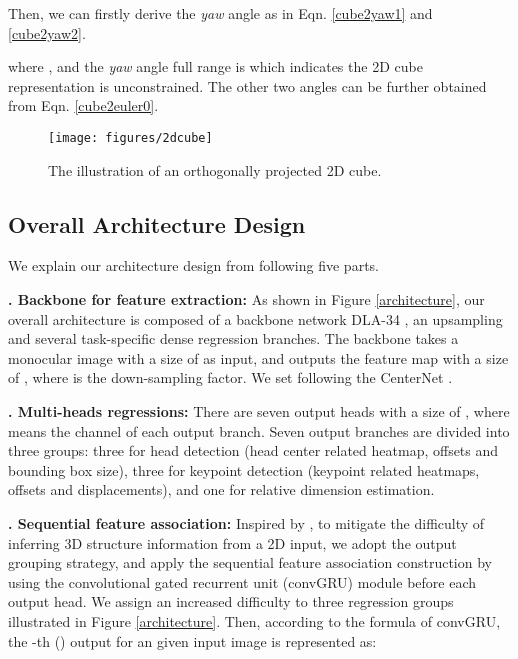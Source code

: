 \documentclass{article}
\begin{document}
Then, we can firstly derive the {\it yaw} angle as in Eqn. \ref{cube2yaw1} and \ref{cube2yaw2}. 


where , and the {\it yaw} angle full range is  which indicates the 2D cube representation is unconstrained. The other two angles can be further obtained from Eqn. \ref{cube2euler0}.

\begin{figure}[!t]
	\centering
	\texttt{[image: figures/2dcube]}
	\caption{The illustration of an orthogonally projected 2D cube.}
	\label{2dcube}
\end{figure}



\subsection{Overall Architecture Design}

We explain our architecture design from following five parts.

{\bf {}. Backbone for feature extraction:}
As shown in Figure \ref{architecture}, our overall architecture is composed of a backbone network DLA-34 \cite{yu2018deep}, an upsampling and several task-specific dense regression branches. The backbone takes a monocular image  with a size of  as input, and outputs the feature map with a size of , where  is the down-sampling factor. We set  following the CenterNet \cite{zhou2019objects}.


{\bf {}. Multi-heads regressions:}
There are seven output heads with a size of , where  means the channel of each output branch. Seven output branches are divided into three groups: three for head detection (head center related heatmap, offsets and bounding box size), three for keypoint detection (keypoint related heatmaps, offsets and displacements), and one for relative dimension estimation.


{\bf {}. Sequential feature association:}
Inspired by \cite{gao2022monocular}, to mitigate the difficulty of inferring 3D structure information from a 2D input, we adopt the output grouping strategy, and apply the sequential feature association construction by using the convolutional gated recurrent unit (convGRU) \cite{ballas2016delving} module before each output head. We assign an increased difficulty to three regression groups illustrated in Figure \ref{architecture}. Then, according to the formula of convGRU, the -th () output for an given input image  is represented as:
\end{document}
